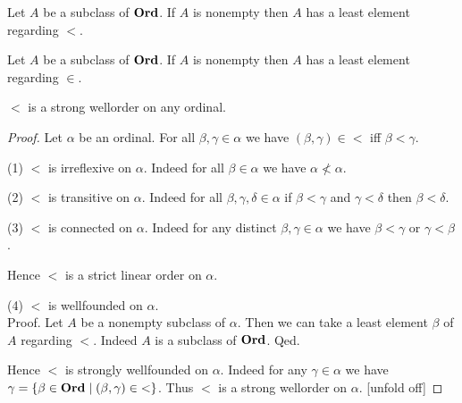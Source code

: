 \documentclass[../../set-theory/set-theory.tex]{subfiles}
\begin{document}
  \begin{forthel}
    \begin{corollary}
      Let $A$ be a subclass of $\mathbf{Ord}$.
      If $A$ is nonempty then $A$ has a least element regarding ${<}$.
    \end{corollary}
  \end{forthel}

  \begin{forthel}
    \begin{corollary}
      Let $A$ be a subclass of $\mathbf{Ord}$.
      If $A$ is nonempty then $A$ has a least element regarding ${\in}$.
    \end{corollary}
  \end{forthel}

  \begin{forthel}
    \begin{proposition}
      ${<}$ is a strong wellorder on any ordinal.
    \end{proposition}
    \begin{proof}
      Let $\alpha$ be an ordinal.
      For all $\beta, \gamma \in \alpha$ we have $(\beta,\gamma) \in {<}$ iff
      $\beta < \gamma$.

      (1) ${<}$ is irreflexive on $\alpha$.
      Indeed for all $\beta \in \alpha$ we have $\alpha \nless \alpha$.

      (2) ${<}$ is transitive on $\alpha$.
      Indeed for all $\beta, \gamma, \delta \in \alpha$ if $\beta < \gamma$ and
      $\gamma < \delta$ then $\beta < \delta$.

      (3) ${<}$ is connected on $\alpha$.
      Indeed for any distinct $\beta, \gamma \in \alpha$ we have
      $\beta < \gamma$ or $\gamma < \beta$.

      Hence ${<}$ is a strict linear order on $\alpha$.

      (4) ${<}$ is wellfounded on $\alpha$. \\
      Proof.
        Let $A$ be a nonempty subclass of $\alpha$.
        Then we can take a least element $\beta$ of $A$ regarding ${<}$.
        Indeed $A$ is a subclass of $\mathbf{Ord}$.
      Qed.

      Hence ${<}$ is strongly wellfounded on $\alpha$.
      Indeed for any $\gamma \in \alpha$ we have
      $\gamma = \{ \beta \in \mathbf{Ord} \mid (\beta,\gamma) \in {<} \}$.
      Thus ${<}$ is a strong wellorder on $\alpha$.
      [unfold off]
    \end{proof}
  \end{forthel}
\end{document}

